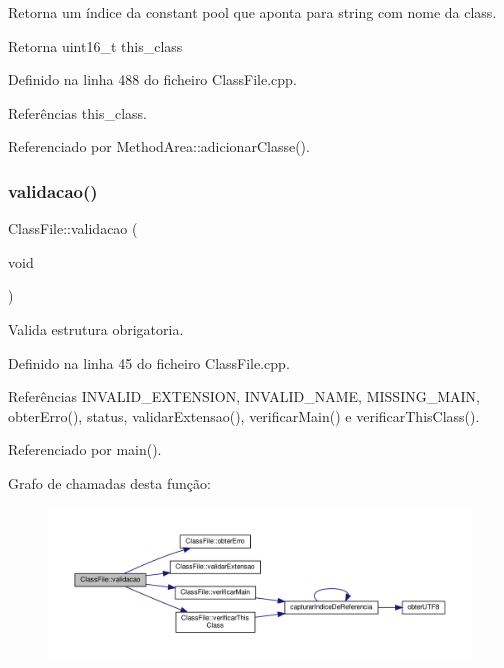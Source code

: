Retorna um índice da constant pool que aponta para string com nome da class. 

\begin{DoxyReturn}{Retorna}
uint16\+\_\+t this\+\_\+class 
\end{DoxyReturn}


Definido na linha 488 do ficheiro Class\+File.\+cpp.



Referências this\+\_\+class.



Referenciado por Method\+Area\+::adicionar\+Classe().

\mbox{\label{classClassFile_acdb7018a6926b187bc6ecc18abf0fff8}} 
\subsubsection{\texorpdfstring{validacao()}{validacao()}}
{\footnotesize\ttfamily Class\+File\+::validacao (\begin{DoxyParamCaption}\item[{void}]{ }\end{DoxyParamCaption})}



Valida estrutura obrigatoria. 



Definido na linha 45 do ficheiro Class\+File.\+cpp.



Referências I\+N\+V\+A\+L\+I\+D\+\_\+\+E\+X\+T\+E\+N\+S\+I\+ON, I\+N\+V\+A\+L\+I\+D\+\_\+\+N\+A\+ME, M\+I\+S\+S\+I\+N\+G\+\_\+\+M\+A\+IN, obter\+Erro(), status, validar\+Extensao(), verificar\+Main() e verificar\+This\+Class().



Referenciado por main().

Grafo de chamadas desta função\+:
\nopagebreak
\begin{figure}[H]
\begin{center}
\leavevmode
\includegraphics[width=350pt]{classClassFile_acdb7018a6926b187bc6ecc18abf0fff8_cgraph}
\end{center}
\end{figure}
\mbox{\label{classClassFile_a8dd042ff6873b9f0d16f8ee3812261e1}} 
